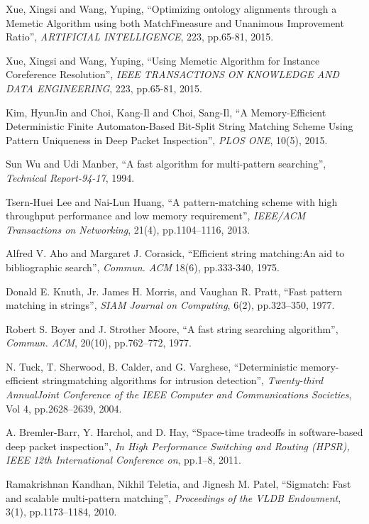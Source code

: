 \documentclass{article}
\begin{document}
\begin{thebibliography}{99}

 Xue, Xingsi and Wang, Yuping, ``Optimizing ontology
  alignments through a Memetic Algorithm using both MatchFmeasure and
  Unanimous Improvement Ratio'', {\it ARTIFICIAL INTELLIGENCE}, 223,
  pp.65-81, 2015.

 Xue, Xingsi and Wang, Yuping, ``Using Memetic
  Algorithm for Instance Coreference Resolution'', {\it IEEE
    TRANSACTIONS ON KNOWLEDGE AND DATA ENGINEERING}, 223, pp.65-81,
  2015.

 Kim, HyunJin and Choi, Kang-Il and Choi, Sang-Il,
  ``A Memory-Efficient Deterministic Finite Automaton-Based Bit-Split
  String Matching Scheme Using Pattern Uniqueness in Deep Packet
  Inspection'', {\it PLOS ONE}, 10(5), 2015.
  
 Sun Wu and Udi Manber, ``A fast algorithm for
  multi-pattern searching'', {\it Technical Report-94-17}, 1994.

 Tsern-Huei Lee and Nai-Lun Huang, ``A
  pattern-matching scheme with high throughput performance and low
  memory requirement'', {\it IEEE/ACM Transactions on Networking},
  21(4), pp.1104--1116, 2013.

 Alfred V. Aho and Margaret J. Corasick, ``Efficient
  string matching:An aid to bibliographic search'', {\it Commun. ACM}
  18(6), pp.333-340, 1975.

 Donald E. Knuth, Jr. James H. Morris, and Vaughan
  R. Pratt, ``Fast pattern matching in strings'', {\it SIAM Journal on
    Computing}, 6(2), pp.323–350, 1977.

 Robert S. Boyer and J. Strother Moore, ``A fast
  string searching algorithm'', {\it Commun. ACM}, 20(10), pp.762–772,
  1977.

 N. Tuck, T. Sherwood, B. Calder, and G. Varghese,
  ``Deterministic memory-efficient stringmatching algorithms for
  intrusion detection'', {\it Twenty-third AnnualJoint Conference of
    the IEEE Computer and Communications Societies}, Vol 4,
  pp.2628–2639, 2004.

 A. Bremler-Barr, Y. Harchol, and D. Hay,
  ``Space-time tradeoffs in software-based deep packet inspection'',
  {\it In High Performance Switching and Routing (HPSR), IEEE 12th
    International Conference on}, pp.1–8, 2011.

 Ramakrishnan Kandhan, Nikhil Teletia, and
  Jignesh M. Patel, ``Sigmatch: Fast and scalable multi-pattern
  matching'', {\it Proceedings of the VLDB Endowment}, 3(1),
  pp.1173–1184, 2010.


\end{thebibliography}
\end{document}
